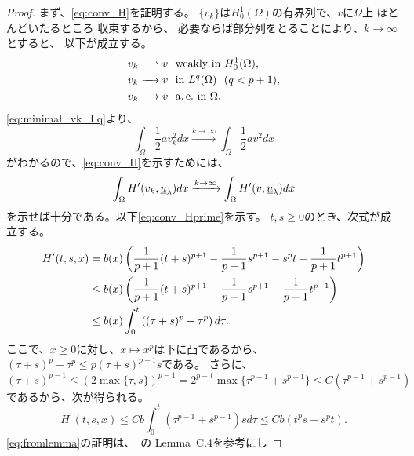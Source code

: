 \begin{proof}
 まず、\eqref{eq:conv_H}を証明する。
 $\{ v_k \}$は$H_0^1(\Omega)$の有界列で、$v$に$\Omega$上
 ほとんどいたるところ
 収束するから、
 必要ならば部分列をとることにより、$k \to \infty$とすると、
 以下が成立する。
 \begin{align}
  v_k \xrightharpoonup{ \mbox{ ~ } } v & \ \ \text{weakly~} \tin
  H_0^1(\Omega), \label{eq:minimal_vk_weakly} \\
  v_k \xrightarrow{ \mbox{ ~ } } v & \ \ \tin L^q(\Omega) \ \
   (q < p+1), \label{eq:minimal_vk_Lq} \\
  v_k \xrightarrow{ \mbox{ ~ } } v & \ \ \ae \tin \Omega. 
    \label{eq:minimal_vk_ae}
 \end{align}
 \eqref{eq:minimal_vk_Lq}より、
 \[
  \int_\Omega \frac{1}{2} a v_k^2 dx \xrightarrow{k \to \infty}
 \int_\Omega \frac{1}{2}av^2 dx
 \]
 がわかるので、\eqref{eq:conv_H}を示すためには、
 \begin{equation}
  \int_\Omega H^\prime(v_k, \underline{u}_\lambda)dx \xrightarrow{ k \to \infty } 
  \int_\Omega H^\prime(v, \underline{u}_\lambda)dx \label{eq:conv_Hprime} \\  
 \end{equation}
 を示せば十分である。以下\eqref{eq:conv_Hprime}を示す。
 $t, s \geq 0$のとき、次式が成立する。
 \begin{align}
  H^\prime(t, s, x) &= b(x) \left( \frac{1}{p+1}(t+s)^{p+1} -
  \frac{1}{p+1} s^{p+1} - s^p t - \frac{1}{p+1} t^{p+1} \right) \notag \\
  & \leq b(x) \left( \frac{1}{p+1}(t+s)^{p+1} - \frac{1}{p+1}s^{p+1} -
  \frac{1}{p+1} t^{p+1}\right) \notag \\
  & \leq b(x) \int_0^t \left( (\tau + s)^p - \tau^p \right)
  d\tau. \label{eq:dtau} 
 \end{align}
 ここで、$x \geq 0$に対し、$x \mapsto x^p$は下に凸であるから、
 $(\tau + s)^p - \tau^p \leq p(\tau + s)^{p-1} s$である。
 さらに、
 \begin{equation}
  (\tau + s)^{p-1} \leq (2 \max\{\tau , s\})^{p-1} = 2^{p-1} \max \{
   \tau^{p-1} + s^{p-1} \} \leq C (\tau^{p-1} + s^{p-1}) \label{eq:taus2p-1}
 \end{equation}
 であるから、次が得られる。
 \begin{equation}
  H^\prime(t, s, x) \leq C b \int_0^t (\tau^{p-1} + s^{p-1}) s d \tau
   \leq C b ( t^{p} s + s^{p} t). \label{eq:fromlemma}
 \end{equation}
 \eqref{eq:fromlemma}の証明は、\cite{MR2317491}~の Lemma~C.4を参考にし

\end{proof}
